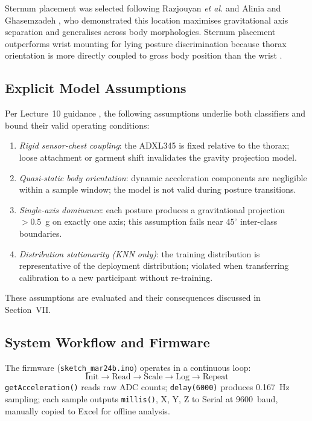 \documentclass[journal]{IEEEtran}
\begin{document}
Sternum placement was selected following Razjouyan \textit{et al.}
\cite{razjouyan2017} and Alinia and Ghasemzadeh \cite{alinia2020}, who
demonstrated this location maximises gravitational axis separation and
generalises across body morphologies. Sternum placement outperforms wrist
mounting for lying posture discrimination because thorax orientation is more
directly coupled to gross body position than the wrist \cite{jeng2021}.

\subsection{Explicit Model Assumptions}
Per Lecture~10 guidance , the following assumptions
underlie both classifiers and bound their valid operating conditions:
\begin{enumerate}
  \item \textit{Rigid sensor-chest coupling}: the ADXL345 is fixed relative
        to the thorax; loose attachment or garment shift invalidates the
        gravity projection model.
  \item \textit{Quasi-static body orientation}: dynamic acceleration
        components are negligible within a sample window; the model is
        not valid during posture transitions.
  \item \textit{Single-axis dominance}: each posture produces a gravitational
        projection $>0.5$~g on exactly one axis; this assumption fails near
        $45^\circ$ inter-class boundaries.
  \item \textit{Distribution stationarity (KNN only)}: the training
        distribution is representative of the deployment distribution;
        violated when transferring calibration to a new participant without
        re-training.
\end{enumerate}
These assumptions are evaluated and their consequences discussed in
Section~VII.

\subsection{System Workflow and Firmware}
The firmware (\texttt{sketch\_mar24b.ino}) operates in a continuous loop:
\begin{equation}
\text{Init} \to \text{Read} \to \text{Scale} \to \text{Log} \to \text{Repeat}
\end{equation}
\texttt{getAcceleration()} reads raw ADC counts; \texttt{delay(6000)}
produces 0.167~Hz sampling; each sample outputs \texttt{millis()}, X, Y, Z
to Serial at 9600~baud, manually copied to Excel for offline analysis.
\end{document}
